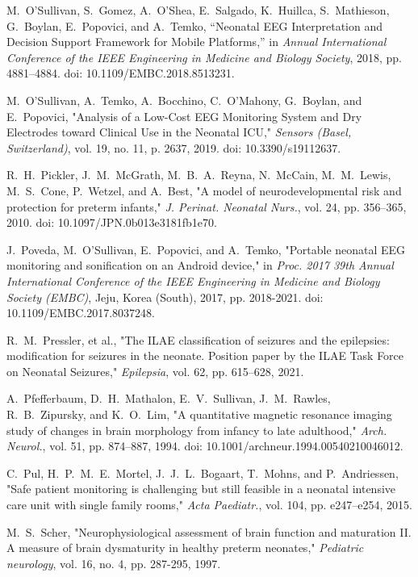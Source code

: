 \documentclass[12pt,journal,compsoc]{IEEEtran}
\begin{document}
\begin{thebibliography}{1}
M.~O'Sullivan, S.~Gomez, A.~O'Shea, E.~Salgado, K.~Huillca, S.~Mathieson, G.~Boylan, E.~Popovici, and A.~Temko, “Neonatal EEG Interpretation and Decision Support Framework for Mobile Platforms,” in \emph{Annual International Conference of the IEEE Engineering in Medicine and Biology Society}, 2018, pp. 4881–4884. doi: 10.1109/EMBC.2018.8513231.

M.~O'Sullivan, A.~Temko, A.~Bocchino, C.~O'Mahony, G.~Boylan, and E.~Popovici, "Analysis of a Low-Cost EEG Monitoring System and Dry Electrodes toward Clinical Use in the Neonatal ICU," \emph{Sensors (Basel, Switzerland)}, vol. 19, no. 11, p. 2637, 2019. doi: 10.3390/s19112637.

R.~H.~Pickler, J.~M.~McGrath, M.~B.~A.~Reyna, N.~McCain, M.~M.~Lewis, M.~S.~Cone, P.~Wetzel, and A.~Best, "A model of neurodevelopmental risk and protection for preterm infants," \emph{J. Perinat. Neonatal Nurs.}, vol. 24, pp. 356–365, 2010. doi: 10.1097/JPN.0b013e3181fb1e70.

J.~Poveda, M.~O'Sullivan, E.~Popovici, and A.~Temko, "Portable neonatal EEG monitoring and sonification on an Android device," in \emph{Proc. 2017 39th Annual International Conference of the IEEE Engineering in Medicine and Biology Society (EMBC)}, Jeju, Korea (South), 2017, pp. 2018-2021. doi: 10.1109/EMBC.2017.8037248.

R.~M.~Pressler, et al., "The ILAE classification of seizures and the epilepsies: modification for seizures in the neonate. Position paper by the ILAE Task Force on Neonatal Seizures," \emph{Epilepsia}, vol. 62, pp. 615–628, 2021.

A.~Pfefferbaum, D.~H.~Mathalon, E.~V.~Sullivan, J.~M.~Rawles, R.~B.~Zipursky, and K.~O.~Lim, "A quantitative magnetic resonance imaging study of changes in brain morphology from infancy to late adulthood," \emph{Arch. Neurol.}, vol. 51, pp. 874–887, 1994. doi: 10.1001/archneur.1994.00540210046012.

C.~Pul, H.~P.~M.~E.~Mortel, J.~J.~L.~Bogaart, T.~Mohns, and P.~Andriessen, "Safe patient monitoring is challenging but still feasible in a neonatal intensive care unit with single family rooms," \emph{Acta Paediatr.}, vol. 104, pp. e247–e254, 2015.

M.~S.~Scher, "Neurophysiological assessment of brain function and maturation II. A measure of brain dysmaturity in healthy preterm neonates," \emph{Pediatric neurology}, vol. 16, no. 4, pp. 287-295, 1997.


\end{thebibliography}
\end{document}
